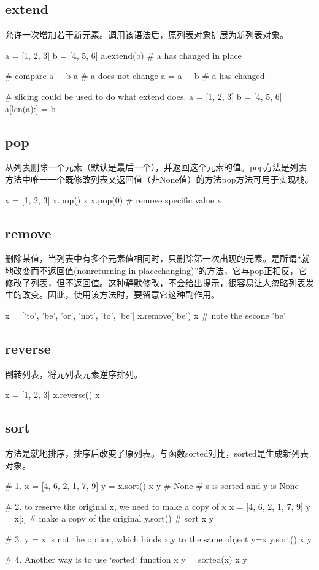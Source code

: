 \subsection{extend}
允许一次增加若干新元素。调用该语法后，原列表对象扩展为新列表对象。
\begin{python}
a = [1, 2, 3]
b = [4, 5, 6]
a.extend(b)  # a has changed in place

# compare
a + b
a  # a does not change
a = a + b # a has changed

# slicing could be used to do what extend does.
a = [1, 2, 3]
b = [4, 5, 6]
a[len(a):] = b
\end{python}
\subsection{pop}
从列表删除一个元素（默认是最后一个），并返回这个元素的值。pop方法是列表方法中唯一一个既修改列表又返回值（非None值）的方法pop方法可用于实现栈。
\begin{python}
x = [1, 2, 3]
x.pop()
x
x.pop(0)  # remove specific value
x
\end{python}
\subsection{remove}
删除某值，当列表中有多个元素值相同时，只删除第一次出现的元素。是所谓“就地改变而不返回值(nonreturning in-placechanging)”的方法，它与pop正相反，它修改了列表，但不返回值。这种静默修改，不会给出提示，很容易让人忽略列表发生的改变。因此，使用该方法时，要留意它这种副作用。
\begin{python}
x = ['to', 'be', 'or', 'not', 'to', 'be']
x.remove('be')
x
# note the secone 'be'
\end{python}
\subsection{reverse}
倒转列表，将元列表元素逆序排列。
\begin{python}
x = [1, 2, 3]
x.reverse()
x
\end{python}
\subsection{sort}
方法是就地排序，排序后改变了原列表。与函数sorted对比，sorted是生成新列表对象。
\begin{python}
  # 1.
  x = [4, 6, 2, 1, 7, 9]
  y = x.sort()
  x
  y # None
  # s is sorted and y is None

  # 2. to reserve the original x, we need to make a copy of x
  x = [4, 6, 2, 1, 7, 9]
  y = x[:]  # make a copy of the original
  y.sort()  # sort
  x
  y

  # 3. y = x is not the option, which binds x,y to the same object
  y=x
  y.sort()
  x
  y

  # 4. Another way is to use `sorted` function
  x
  y = sorted(x)
  x
  y
\end{python}
